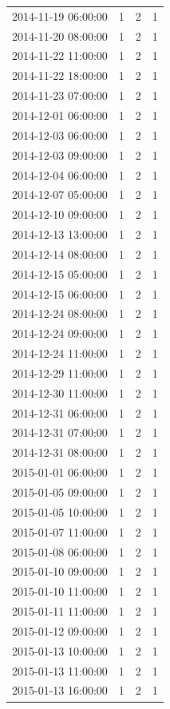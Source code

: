 \begin{tabular}{lrrr}
2014-11-19 06:00:00 & 1 & 2 & 1 \\
2014-11-20 08:00:00 & 1 & 2 & 1 \\
2014-11-22 11:00:00 & 1 & 2 & 1 \\
2014-11-22 18:00:00 & 1 & 2 & 1 \\
2014-11-23 07:00:00 & 1 & 2 & 1 \\
2014-12-01 06:00:00 & 1 & 2 & 1 \\
2014-12-03 06:00:00 & 1 & 2 & 1 \\
2014-12-03 09:00:00 & 1 & 2 & 1 \\
2014-12-04 06:00:00 & 1 & 2 & 1 \\
2014-12-07 05:00:00 & 1 & 2 & 1 \\
2014-12-10 09:00:00 & 1 & 2 & 1 \\
2014-12-13 13:00:00 & 1 & 2 & 1 \\
2014-12-14 08:00:00 & 1 & 2 & 1 \\
2014-12-15 05:00:00 & 1 & 2 & 1 \\
2014-12-15 06:00:00 & 1 & 2 & 1 \\
2014-12-24 08:00:00 & 1 & 2 & 1 \\
2014-12-24 09:00:00 & 1 & 2 & 1 \\
2014-12-24 11:00:00 & 1 & 2 & 1 \\
2014-12-29 11:00:00 & 1 & 2 & 1 \\
2014-12-30 11:00:00 & 1 & 2 & 1 \\
2014-12-31 06:00:00 & 1 & 2 & 1 \\
2014-12-31 07:00:00 & 1 & 2 & 1 \\
2014-12-31 08:00:00 & 1 & 2 & 1 \\
2015-01-01 06:00:00 & 1 & 2 & 1 \\
2015-01-05 09:00:00 & 1 & 2 & 1 \\
2015-01-05 10:00:00 & 1 & 2 & 1 \\
2015-01-07 11:00:00 & 1 & 2 & 1 \\
2015-01-08 06:00:00 & 1 & 2 & 1 \\
2015-01-10 09:00:00 & 1 & 2 & 1 \\
2015-01-10 11:00:00 & 1 & 2 & 1 \\
2015-01-11 11:00:00 & 1 & 2 & 1 \\
2015-01-12 09:00:00 & 1 & 2 & 1 \\
2015-01-13 10:00:00 & 1 & 2 & 1 \\
2015-01-13 11:00:00 & 1 & 2 & 1 \\
2015-01-13 16:00:00 & 1 & 2 & 1 \\

\end{tabular}
